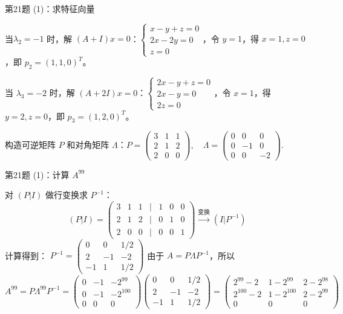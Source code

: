 \documentclass[aspectratio=169]{beamer}
\begin{document}
\begin{frame}{第21题 (1)：求特征向量}
\begin{block}{}
当\(\lambda_2 = -1\) 时，解 \((A+I)x=0\)：\(\begin{cases} x-y+z=0 \\ 2x-2y=0 \\ z=0 \end{cases}\)，令 \(y=1\)，得 \(x=1, z=0\)，即 \(p_2 = (1,1,0)^T\)。

当 \(\lambda_3 = -2\) 时，解 \((A+2I)x=0\)：\(\begin{cases} 2x-y+z=0 \\ 2x-y=0 \\ 2z=0 \end{cases}\)，令 \(x=1\)，得 \(y=2, z=0\)，即 \(p_3 = (1,2,0)^T\)。

构造可逆矩阵 \(P\) 和对角矩阵 \(\Lambda\)：$P = \begin{pmatrix} 3 & 1 & 1 \\ 2 & 1 & 2 \\ 2 & 0 & 0 \end{pmatrix}, \quad \Lambda = \begin{pmatrix} 0 & 0 & 0 \\ 0 & -1 & 0 \\ 0 & 0 & -2 \end{pmatrix}.$
\end{block}
\end{frame}

\begin{frame}{第21题 (1)：计算 \(A^{99}\)}
\begin{block}{}
对 \((P|I)\) 做行变换求 \(P^{-1}\)：
\[
(P|I) = \begin{pmatrix} 3 & 1 & 1 & | & 1 & 0 & 0 \\ 2 & 1 & 2 & | & 0 & 1 & 0 \\ 2 & 0 & 0 & | & 0 & 0 & 1 \end{pmatrix} \xrightarrow{变换} (I|P^{-1})
\]
计算得到：
$P^{-1} = \begin{pmatrix} 0 & 0 & 1/2 \\ 2 & -1 & -2 \\ -1 & 1 & 1/2 \end{pmatrix}$
由于 \(A = P \Lambda P^{-1}\)，所以
\[
A^{99}=P \Lambda^{99} P^{-1} = \begin{pmatrix} 0 & -1 & -2^{99} \\ 0 & -1 & -2^{100} \\ 0 & 0 & 0 \end{pmatrix} \begin{pmatrix} 0 & 0 & 1/2 \\ 2 & -1 & -2 \\ -1 & 1 & 1/2 \end{pmatrix} = \begin{pmatrix} 2^{99}-2 & 1-2^{99} & 2-2^{98} \\ 2^{100}-2 & 1-2^{100} & 2-2^{99} \\ 0 & 0 & 0 \end{pmatrix}
\]
\end{block}
\end{frame}
\end{document}
